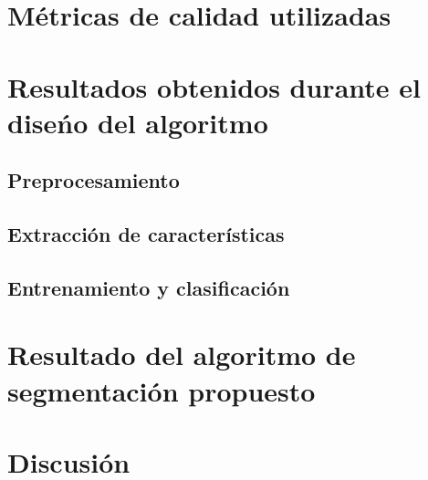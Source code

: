 \section{M\'etricas de calidad utilizadas}



\section{Resultados obtenidos durante el dise\'no del algoritmo}


\subsection{Preprocesamiento}


\subsection{Extracci\'on de caracter\'isticas}



\subsection{Entrenamiento y clasificaci\'on}

\section{Resultado del algoritmo de segmentaci\'on propuesto}

\section{Discusi\'on}

